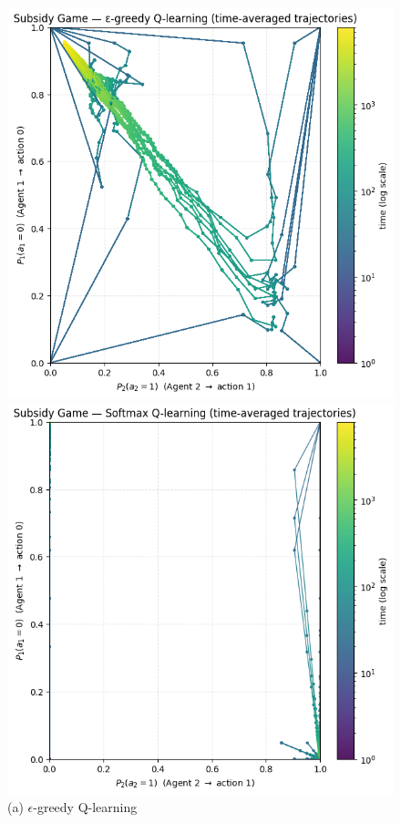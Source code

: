 \begin{figure}[h]
    \centering
    \begin{minipage}{0.32\textwidth}
        \centering
        \includegraphics[width=\linewidth]{figures/task-2/learning/sg_egreedy.png}
        \caption*{(a) $\epsilon$-greedy Q-learning}
    \end{minipage}
    \hfill
    \begin{minipage}{0.32\textwidth}
        \centering
        \includegraphics[width=\linewidth]{figures/task-2/learning/sg_boltz.png}

\end{minipage}
\end{figure}

